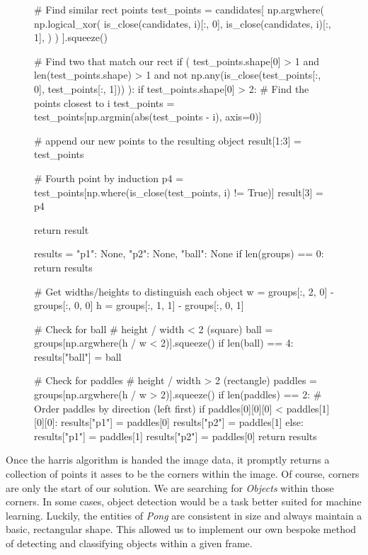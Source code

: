 \documentclass{report}
\begin{document}
\begin{figure}[ht]
    \centering
\begin{codeblock}
# Find similar rect points 
test_points = candidates[
    np.argwhere(
        np.logical_xor(
            is_close(candidates, i)[:, 0],
            is_close(candidates, i)[:, 1],
        )
    )
].squeeze()

# Find two that match our rect
if (
    test_points.shape[0] > 1
    and len(test_points.shape) > 1
    and not np.any(is_close(test_points[:, 0], test_points[:, 1]))
):
    if test_points.shape[0] > 2:
        # Find the points closest to i
        test_points = test_points[np.argmin(abs(test_points - i), axis=0)]

    # append our new points to the resulting object
    result[1:3] = test_points

# Fourth point by induction
p4 = test_points[np.where(is_close(test_points, i) != True)]
result[3] = p4

return result
\end{codeblock}
        \label{code:detect}
\end{figure}

\begin{figure}[ht]
    \centering
    \begin{codeblock}
results = {"p1": None, "p2": None, "ball": None}
if len(groups) == 0:
    return results

# Get widths/heights to distinguish each object
w = groups[:, 2, 0] - groups[:, 0, 0]
h = groups[:, 1, 1] - groups[:, 0, 1]

# Check for ball
# height / width < 2 (square)
ball = groups[np.argwhere(h / w < 2)].squeeze()
if len(ball) == 4:
    results["ball"] = ball

# Check for paddles
# height / width > 2 (rectangle) 
paddles = groups[np.argwhere(h / w > 2)].squeeze()
if len(paddles) == 2:
    # Order paddles by direction (left first)
    if paddles[0][0][0] < paddles[1][0][0]:
        results["p1"] = paddles[0]
        results["p2"] = paddles[1]
    else:
        results["p1"] = paddles[1]
        results["p2"] = paddles[0]
return results
\end{codeblock}
        \label{code:classify}
\end{figure}

Once the harris algorithm is handed the image data, it promptly returns a collection of points it asses to be the corners within the image. Of course, corners are only the start of our solution. We are searching for \emph{Objects} within those corners. In some cases, object detection would be a task better suited for machine learning. Luckily, the entities of \emph{Pong} are consistent in size and always maintain a basic, rectangular shape. This allowed us to implement our own bespoke method of detecting and classifying objects within a given frame.
\end{document}
